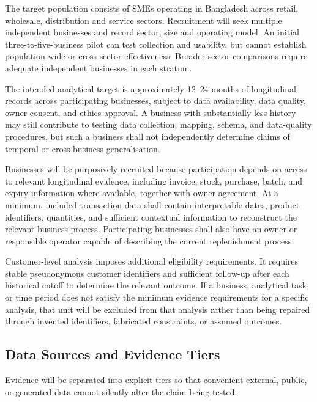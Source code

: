 \documentclass[a4paper,11pt,oneside]{book}
\theoremstyle{plain}
\theoremstyle{definition}
\theoremstyle{remark}
\begin{document}
The target population consists of SMEs operating in Bangladesh across
retail, wholesale, distribution and service sectors. Recruitment will seek
multiple independent businesses and record sector, size and operating model.
An initial three-to-five-business pilot can test collection and usability,
but cannot establish population-wide or cross-sector effectiveness. Broader
sector comparisons require adequate independent businesses in each stratum.

The intended analytical target is approximately 12--24 months of longitudinal
records across participating businesses, subject to data availability, data
quality, owner consent, and ethics approval. A business with substantially less
history may still contribute to testing data collection, mapping, schema, and
data-quality procedures, but such a business shall not independently determine
claims of temporal or cross-business generalisation.

Businesses will be purposively recruited because participation depends on access
to relevant longitudinal evidence, including invoice, stock, purchase, batch,
and expiry information where available, together with owner agreement. At a
minimum, included transaction data shall contain interpretable dates, product
identifiers, quantities, and sufficient contextual information to reconstruct
the relevant business process. Participating businesses shall also have an owner
or responsible operator capable of describing the current replenishment process.

Customer-level analysis imposes additional eligibility requirements. It requires
stable pseudonymous customer identifiers and sufficient follow-up after each
historical cutoff to determine the relevant outcome. If a business, analytical
task, or time period does not satisfy the minimum evidence requirements for a
specific analysis, that unit will be excluded from that analysis rather than
being repaired through invented identifiers, fabricated constraints, or assumed
outcomes.


\subsection{Data Sources and Evidence Tiers}

Evidence will be separated into explicit tiers so that convenient external,
public, or generated data cannot silently alter the claim being tested.
\end{document}
